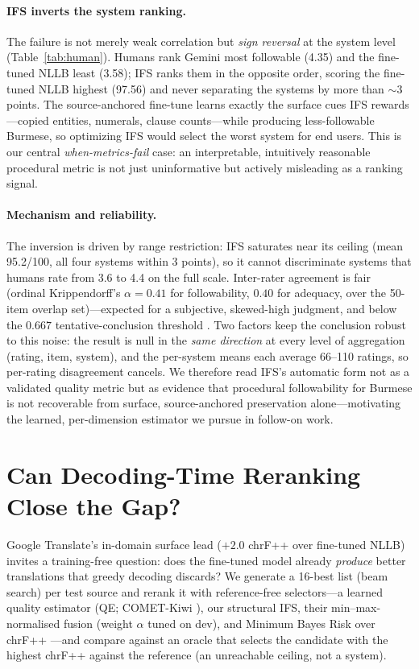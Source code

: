 \documentclass[11pt]{article}
\begin{document}


\paragraph{IFS inverts the system ranking.} The failure is not merely weak correlation but
\emph{sign reversal} at the system level (Table~\ref{tab:human}). Humans rank Gemini most
followable (4.35) and the fine-tuned NLLB least (3.58); IFS ranks them in the opposite order,
scoring the fine-tuned NLLB highest (97.56) and never separating the systems by more than
$\sim$3 points. The source-anchored fine-tune learns exactly the surface cues IFS
rewards---copied entities, numerals, clause counts---while producing less-followable Burmese,
so optimizing IFS would select the worst system for end users. This is our central
\emph{when-metrics-fail} case: an interpretable, intuitively reasonable procedural metric is
not just uninformative but actively misleading as a ranking signal.



\paragraph{Mechanism and reliability.} The inversion is driven by range restriction: IFS
saturates near its ceiling (mean 95.2/100, all four systems within 3 points), so it cannot
discriminate systems that humans rate from 3.6 to 4.4 on the full scale. Inter-rater agreement
is fair (ordinal Krippendorff's $\alpha{=}0.41$ for followability, $0.40$ for adequacy, over
the 50-item overlap set)---expected for a subjective, skewed-high judgment, and below the
$0.667$ tentative-conclusion threshold \citep{krippendorff2004}. Two factors keep the
conclusion robust to this noise: the result is null in the \emph{same direction} at every level
of aggregation (rating, item, system), and the per-system means each average 66--110 ratings,
so per-rating disagreement cancels. We therefore read IFS's automatic form not as a validated
quality metric but as evidence that procedural followability for Burmese is not recoverable
from surface, source-anchored preservation alone---motivating the learned, per-dimension
estimator we pursue in follow-on work.

\section{Can Decoding-Time Reranking Close the Gap?}\label{sec:rerank}
Google Translate's in-domain surface lead ($+2.0$ chrF++ over fine-tuned NLLB) invites a
training-free question: does the fine-tuned model already \emph{produce} better translations
that greedy decoding discards? We generate a 16-best list (beam search) per test source and
rerank it with reference-free selectors---a learned quality estimator (QE; COMET-Kiwi
\citep{rei2022cometkiwi}), our structural IFS, their min--max-normalised fusion (weight
$\alpha$ tuned on dev), and Minimum Bayes Risk over chrF++
\citep{eikema2020mbr,freitag2022mbr}---and compare against an oracle that selects the
candidate with the highest chrF++ against the reference (an unreachable ceiling, not a system).
\end{document}
